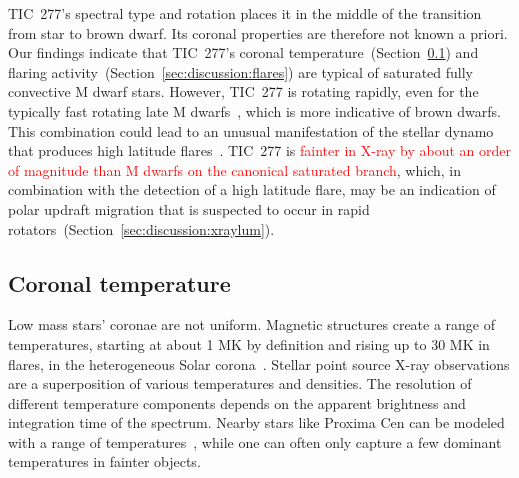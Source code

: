 \documentclass[twocolumn]{aastex631}
\begin{document}
TIC~277's spectral type and rotation places it in the middle of the transition from star to brown dwarf. Its coronal properties are therefore not known a priori. Our findings indicate that TIC~277's coronal temperature~(Section~\ref{sec:discussion:xraytemp}) and flaring activity~(Section~\ref{sec:discussion:flares}) are typical of saturated fully convective M dwarf stars. However, TIC~277 is rotating rapidly, even for the typically fast rotating late M dwarfs~\citep{medina2022galactic}, which is more indicative of brown dwarfs. This combination could lead to an unusual manifestation of the stellar dynamo that produces high latitude flares~\citep{weber2016modeling, weber2023understanding}. TIC~277 is \textcolor{red}{fainter in X-ray by about an order of magnitude than M dwarfs on the canonical saturated branch}, which, in combination with the detection of a high latitude flare, may be an indication of polar updraft migration that is suspected to occur in rapid rotators~(Section~\ref{sec:discussion:xraylum}).


\subsection{Coronal temperature}
\label{sec:discussion:xraytemp}
Low mass stars' coronae are not uniform. Magnetic structures create a range of temperatures, starting at about 1 MK by definition and rising up to 30 MK in flares, in the heterogeneous Solar corona~\citep{vaiana1978recent}. Stellar point source X-ray observations are a superposition of various temperatures and densities. The resolution of different temperature components depends on the apparent brightness and integration time of the spectrum. Nearby stars like Proxima Cen can be modeled with a range of temperatures~\citep[e.g.,][]{gudel2004flares, drake2020pointing}, while one can often only capture a few dominant temperatures in fainter objects.  
\end{document}
